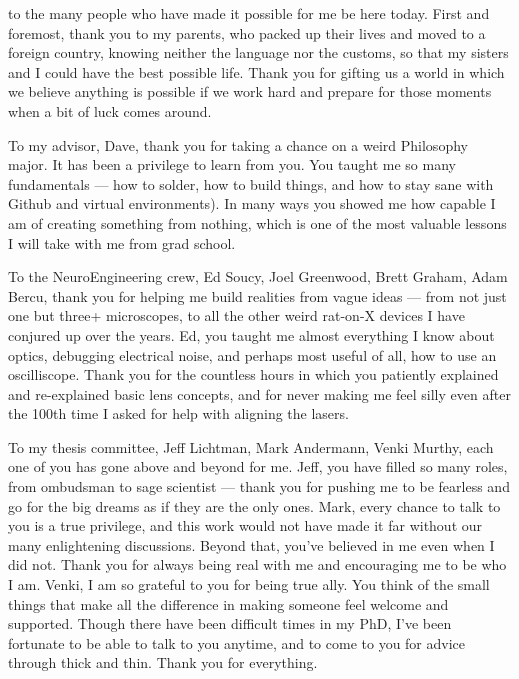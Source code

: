 
 to the many people who have made it possible for me be here today. First and foremost, thank you to my parents, who packed up their lives and moved to a foreign country, knowing neither the language nor the customs, so that my sisters and I could have the best possible life. Thank you for gifting us a world in which we believe anything is possible if we work hard and prepare for those moments when a bit of luck comes around. 

To my advisor, Dave, thank you for taking a chance on a weird Philosophy major. It has been a privilege to learn from you. You taught me so many fundamentals — how to solder, how to build things, and how to stay sane with Github and virtual environments). In many ways you showed me how capable I am of creating something from nothing, which is one of the most valuable lessons I will take with me from grad school. 

To the NeuroEngineering crew, Ed Soucy, Joel Greenwood, Brett Graham, Adam Bercu, thank you for helping me build realities from  vague ideas --- from not just one but three+ microscopes, to all the other weird rat-on-X devices I have conjured up over the years. Ed, you taught me almost everything I know about optics, debugging electrical noise, and perhaps most useful of all, how to use an oscilliscope. Thank you for the countless hours in which you patiently explained and re-explained basic lens concepts, and for never making me feel silly even after the 100th time I asked for help with aligning the lasers. 

To my thesis committee, Jeff Lichtman, Mark Andermann, Venki Murthy, each one of you has gone above and beyond for me. Jeff, you have filled so many roles, from ombudsman to sage scientist — thank you for pushing me to be fearless and go for the big dreams as if they are the only ones. Mark, every chance to talk to you is a true privilege, and this work would not have made it far without our many enlightening discussions. Beyond that, you’ve believed in me even when I did not. Thank you for always being real with me and encouraging me to be who I am. Venki, I am so grateful to you for being true ally. You think of the small things that make all the difference in making someone feel welcome and supported. Though there have been difficult times in my PhD, I’ve been fortunate to be able to talk to you anytime, and to come to you for advice through thick and thin. Thank you for everything.

